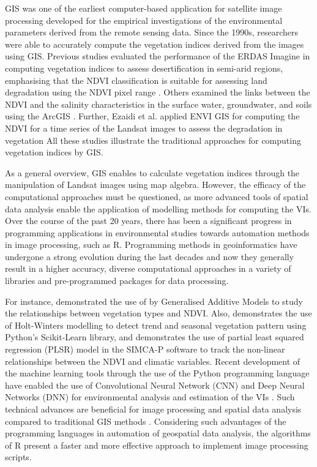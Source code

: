 \documentclass[jimaging,article,submit,pdftex,moreauthors]{Definitions/mdpi}
\begin{document}
GIS was one of the earliest computer-based application for satellite image processing developed for the empirical investigations of the environmental parameters derived from the remote sensing data. Since the 1990s, researchers were able to accurately compute the vegetation indices derived from the images using GIS. Previous studies evaluated the performance of the ERDAS Imagine in computing vegetation indices to assess desertification in semi-arid regions, emphasising that the NDVI classification is suitable for assessing land degradation using the NDVI pixel range \cite{KUMAR2022100578}. Others examined the links between the NDVI and the salinity characteristics in the surface water, groundwater, and soils using the ArcGIS \cite{RASHID2023100314}. Further, Ezaidi et al. applied ENVI GIS for computing the NDVI for a time series of the Landsat images to assess the degradation in vegetation \cite{EZAIDI2022100800} All these studies illustrate the traditional approaches for computing vegetation indices by GIS.

As a general overview, GIS enables to calculate vegetation indices through the manipulation of Landsat images using map algebra. However, the efficacy of the computational approaches must be questioned, as more advanced tools of spatial data analysis enable the application of modelling methods for computing the VIs. Over the course of the past 20 years, there has been a significant progress in programming applications in environmental studies towards automation methods in image processing, such as R. Programming methods in geoinformatics have undergone a strong evolution during the last decades and now they generally result in a higher accuracy, diverse computational approaches in a variety of libraries and pre-programmed packages for data processing. 

For instance, \cite{MARTINEZ2023115155} demonstrated the use of by Generalised Additive Models to study the relationships between vegetation types and NDVI. Also, \cite{OMAR2021e01020} demonstrates the use of Holt-Winters modelling to detect trend and seasonal vegetation pattern using Python's Scikit-Learn library, and \cite{WANG2022102704} demonstrates the use of partial least squared regression (PLSR) model in the SIMCA-P software to track the non-linear relationships between the NDVI and climatic variables. Recent development of the machine learning tools through the use of the Python programming language have enabled the use of Convolutional Neural Network (CNN) and Deep Neural Networks (DNN) for environmental analysis and estimation of the VIs \cite{BARRIGUINHA2022103069,ROY2021100582,LI2022102818,DAVIDSON2022107396}. Such technical advances are beneficial for image processing and spatial data analysis compared to traditional GIS methods \cite{6049966,Lemenkova202301,6910592,Lemenkova202228,9323708,1027236}. Considering such advantages of the programming languages in automation of geospatial data analysis, the algorithms of R present a faster and more effective approach to implement image processing scripts.
\end{document}
